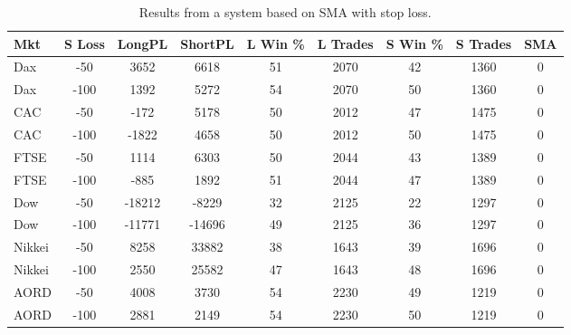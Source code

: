 \begin{table}[ht]
\centering
\caption[Results from a system based on SMA with stop loss]{Results from a system based on SMA with stop loss.} 
\label{tab:sma_results_Sloss}
\begin{tabular}{lcccccccc}
  \toprule Mkt & S Loss & LongPL & ShortPL & L Win \% & L Trades & S Win \% & S Trades & SMA \\ 
  \midrule Dax & -50 & 3652 & 6618 & 51 & 2070 & 42 & 1360 & 0 \\ 
  Dax & -100 & 1392 & 5272 & 54 & 2070 & 50 & 1360 & 0 \\ 
  CAC & -50 & -172 & 5178 & 50 & 2012 & 47 & 1475 & 0 \\ 
  CAC & -100 & -1822 & 4658 & 50 & 2012 & 50 & 1475 & 0 \\ 
  FTSE & -50 & 1114 & 6303 & 50 & 2044 & 43 & 1389 & 0 \\ 
  FTSE & -100 & -885 & 1892 & 51 & 2044 & 47 & 1389 & 0 \\ 
  Dow & -50 & -18212 & -8229 & 32 & 2125 & 22 & 1297 & 0 \\ 
  Dow & -100 & -11771 & -14696 & 49 & 2125 & 36 & 1297 & 0 \\ 
  Nikkei & -50 & 8258 & 33882 & 38 & 1643 & 39 & 1696 & 0 \\ 
  Nikkei & -100 & 2550 & 25582 & 47 & 1643 & 48 & 1696 & 0 \\ 
  AORD & -50 & 4008 & 3730 & 54 & 2230 & 49 & 1219 & 0 \\ 
  AORD & -100 & 2881 & 2149 & 54 & 2230 & 50 & 1219 & 0 \\ 
   \bottomrule \end{tabular}
\end{table}
